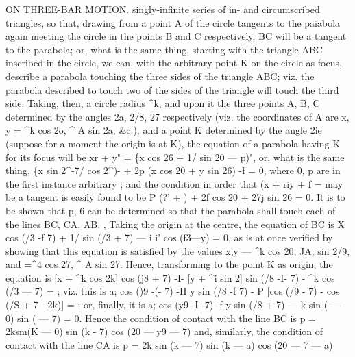 \documentclass[11pt,a4paper]{book}
\begin{document}
ON THREE-BAR MOTION.
singly-infinite
series
of
in-
and
circumscribed
triangles,
so
that,
drawing from
a
point
A
of
the
circle
tangents
to
the
paiabola
again
meeting
the
circle
in
the
points B
and C
respectively, BC
will
be
a
tangent
to
the
parabola;
or,
what
is
the
same
thing,
starting
with
the
triangle ABC
inscribed
in
the
circle,
we
can,
with
the
arbitrary
point K
on
the
circle
as
focus,
describe
a
parabola
touching
the
three
sides
of
the
triangle ABC;
viz.
the
parabola
described
to
touch
two
of
the
sides
of
the
triangle
will touch the third
side.
Taking, then, a
circle
radius
\textasciicircum{}k, and upon
it
the
three
points A, B, C determined
by
the
angles
2a,
2/8,
27
respectively
(viz.
the
coordinates
of A
are
x, y = \textasciicircum{}k cos 2o,
\textasciicircum{} A sin 2a,
\&c.),
and
a
point K
determined
by
the
angle
2ie
(suppose
for
a moment
the origin
is at K), the equation
of a parabola having K
for
its
focus
will be
xr + y" = \{x cos 26 + 1/ sin 20 --- p)",
or, what
is the same thing,
\{x sin 2\textasciicircum{}-7/ cos 2\textasciicircum{})- + 2p (x cos 20 + y sin 26) -f = 0,
where
0, p
are
in
the
first
instance
arbitrary
;
and
the
condition
in
order
that
(x + riy + f =
may be a tangent
is
easily found
to be
P (?' + \textyen{}) + 2f cos 20 + 27j sin 26 = 0.
It
is
to
be
shown
that
p,
6
can
be
determined
so
that
the
parabola
shall
touch
each
of the
lines BC, CA, AB.
,
Taking
the
origin
at
the
centre,
the
equation
of BC
is
X cos (/3 -f 7) + 1/ sin (/3 + 7) --- i i' cos (f3---y) = 0,
as
is at once
verified by showing that
this equation
is
satisfied by the values
x,y --- \textasciicircum{}k cos 20,
JA; sin 2/9,
and =\textasciicircum{}4 cos 27,
\textasciicircum{} A sin 27.
Hence,
transforming
to
the
point K
as
origin, the
equation
is
[x + \textasciicircum{}k cos 2k] cos (j8 + 7) -I- [y + \textasciicircum{}i sin 2\guillemotleft{}] sin (/8
-I- 7) - \textasciicircum{}k cos (/3 --- 7) =
;
viz.
this
is
a; cos ()9
-(- 7) -H y sin (/8 -f 7) - P [cos (/9 - 7) - cos (/S + 7 - 2k)] =
;
or,
finally,
it
is
a; cos (y9 -I- 7) -f y sin (/8 + 7) --- k sin (\guillemotleft{} --- 0) sin (\guillemotleft{} --- 7) = 0.
Hence the condition of contact
with
the
line BC
is
p = 2ksm(K --- 0) sin (k - 7) cos (20 --- y9 --- 7)
and,
similarly,
the condition
of contact
with
the
line CA
is
p = 2k sin (k --- 7) sin (k --- a) cos (20 --- 7 --- a)
\end{document}
